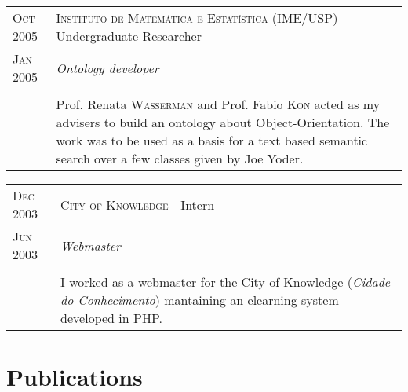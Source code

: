 \documentclass[letter,10pt]{article}
\begin{document}
\begin{tabular}{p{2.5cm}|p{13.5cm}}
  \textsc{Oct 2005} & \textsc{Instituto de Matemática e Estatística
    (IME/USP)} - Undergraduate Researcher\\
  \textsc{Jan 2005}& \emph{Ontology developer}\\
  &\\
  & Prof. Renata \textsc{Wasserman} and Prof. Fabio \textsc{Kon} acted as my
  advisers to build an ontology about Object-Orientation. The work
  was to be used as a basis for a text based semantic search over a
  few classes given by Joe Yoder.
\end{tabular}

\begin{tabular}{p{2.5cm}|p{13.5cm}}
  \textsc{Dec 2003} & \textsc{City of Knowledge} - Intern\\
  \textsc{Jun 2003}& \emph{Webmaster}\\
  &\\
  & I worked as a webmaster for the City of Knowledge (\textit{Cidade
    do Conhecimento}) mantaining an elearning system developed in PHP.
\end{tabular}

\section{Publications}
\end{document}
